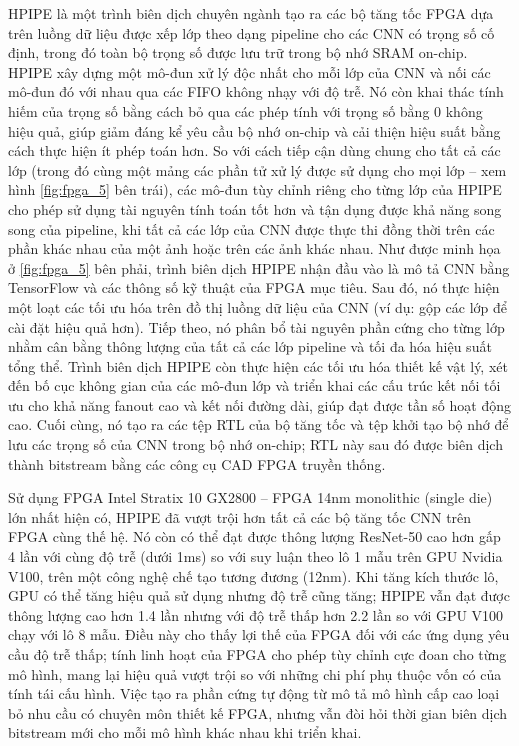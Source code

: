 \documentclass[a4paper]{article}
\begin{document}
HPIPE là một trình biên dịch chuyên ngành tạo ra các bộ tăng tốc FPGA dựa trên luồng dữ liệu được xếp lớp theo dạng pipeline cho các CNN có trọng số cố định, trong đó toàn bộ trọng số được lưu trữ trong bộ nhớ SRAM on-chip. HPIPE xây dựng một mô-đun xử lý độc nhất cho mỗi lớp của CNN và nối các mô-đun đó với nhau qua các FIFO không nhạy với độ trễ. Nó còn khai thác tính hiếm của trọng số bằng cách bỏ qua các phép tính với trọng số bằng 0 không hiệu quả, giúp giảm đáng kể yêu cầu bộ nhớ on-chip và cải thiện hiệu suất bằng cách thực hiện ít phép toán hơn. So với cách tiếp cận dùng chung cho tất cả các lớp (trong đó cùng một mảng các phần tử xử lý được sử dụng cho mọi lớp – xem hình \ref{fig:fpga_5} bên trái), các mô-đun tùy chỉnh riêng cho từng lớp của HPIPE cho phép sử dụng tài nguyên tính toán tốt hơn và tận dụng được khả năng song song của pipeline, khi tất cả các lớp của CNN được thực thi đồng thời trên các phần khác nhau của một ảnh hoặc trên các ảnh khác nhau. Như được minh họa ở \ref{fig:fpga_5} bên phải, trình biên dịch HPIPE nhận đầu vào là mô tả CNN bằng TensorFlow và các thông số kỹ thuật của FPGA mục tiêu. Sau đó, nó thực hiện một loạt các tối ưu hóa trên đồ thị luồng dữ liệu của CNN (ví dụ: gộp các lớp để cài đặt hiệu quả hơn). Tiếp theo, nó phân bổ tài nguyên phần cứng cho từng lớp nhằm cân bằng thông lượng của tất cả các lớp pipeline và tối đa hóa hiệu suất tổng thể. Trình biên dịch HPIPE còn thực hiện các tối ưu hóa thiết kế vật lý, xét đến bố cục không gian của các mô-đun lớp và triển khai các cấu trúc kết nối tối ưu cho khả năng fanout cao và kết nối đường dài, giúp đạt được tần số hoạt động cao. Cuối cùng, nó tạo ra các tệp RTL của bộ tăng tốc và tệp khởi tạo bộ nhớ để lưu các trọng số của CNN trong bộ nhớ on-chip; RTL này sau đó được biên dịch thành bitstream bằng các công cụ CAD FPGA truyền thống.

Sử dụng FPGA Intel Stratix 10 GX2800 – FPGA 14nm monolithic (single die) lớn nhất hiện có, HPIPE đã vượt trội hơn tất cả các bộ tăng tốc CNN trên FPGA cùng thế hệ. Nó còn có thể đạt được thông lượng ResNet-50 cao hơn gấp 4 lần với cùng độ trễ (dưới 1ms) so với suy luận theo lô 1 mẫu trên GPU Nvidia V100, trên một công nghệ chế tạo tương đương (12nm). Khi tăng kích thước lô, GPU có thể tăng hiệu quả sử dụng nhưng độ trễ cũng tăng; HPIPE vẫn đạt được thông lượng cao hơn 1.4 lần nhưng với độ trễ thấp hơn 2.2 lần so với GPU V100 chạy với lô 8 mẫu. Điều này cho thấy lợi thế của FPGA đối với các ứng dụng yêu cầu độ trễ thấp; tính linh hoạt của FPGA cho phép tùy chỉnh cực đoan cho từng mô hình, mang lại hiệu quả vượt trội so với những chi phí phụ thuộc vốn có của tính tái cấu hình. Việc tạo ra phần cứng tự động từ mô tả mô hình cấp cao loại bỏ nhu cầu có chuyên môn thiết kế FPGA, nhưng vẫn đòi hỏi thời gian biên dịch bitstream mới cho mỗi mô hình khác nhau khi triển khai.
\end{document}
